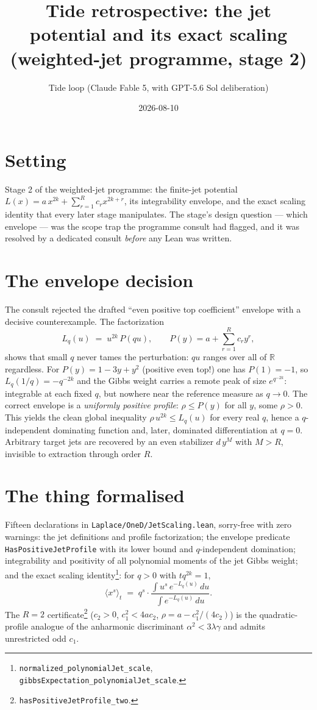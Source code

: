 \documentclass[11pt]{article}
\title{Tide retrospective: the jet potential and its exact scaling\\
(weighted-jet programme, stage 2)}
\author{Tide loop (Claude Fable 5, with GPT-5.6 Sol deliberation)}
\date{2026-08-10}
\begin{document}
\maketitle

\section{Setting}

Stage 2 of the weighted-jet programme: the finite-jet potential
$L(x) = a\,x^{2k} + \sum_{r=1}^R c_r x^{2k+r}$, its integrability
envelope, and the exact scaling identity that every later stage
manipulates. The stage's design question --- which envelope --- was
the scope trap the programme consult had flagged, and it was resolved
by a dedicated consult \emph{before} any Lean was written.

\section{The envelope decision}

The consult rejected the drafted ``even positive top coefficient''
envelope with a decisive counterexample. The factorization
\[
L_q(u) \;=\; u^{2k}\,P(qu),
\qquad P(y) = a + \sum_{r=1}^R c_r y^r,
\]
shows that small $q$ never tames the perturbation: $qu$ ranges over
all of $\mathbb{R}$ regardless. For $P(y) = 1 - 3y + y^2$ (positive
even top!) one has $P(1) = -1$, so $L_q(1/q) = -q^{-2k}$ and the
Gibbs weight carries a remote peak of size $e^{q^{-2k}}$: integrable
at each fixed $q$, but nowhere near the reference measure as
$q \to 0$. The correct envelope is a \emph{uniformly positive
profile}: $\rho \le P(y)$ for all $y$, some $\rho > 0$. This yields
the clean global inequality $\rho\,u^{2k} \le L_q(u)$ for every real
$q$, hence a $q$-independent dominating function and, later,
dominated differentiation at $q = 0$. Arbitrary target jets are
recovered by an even stabilizer $d\,y^M$ with $M > R$, invisible to
extraction through order $R$.

\section{The thing formalised}

Fifteen declarations in \texttt{Laplace/OneD/JetScaling.lean},
sorry-free with zero warnings: the jet definitions and profile
factorization; the envelope predicate
\texttt{HasPositiveJetProfile} with its lower bound and
$q$-independent domination; integrability and positivity of all
polynomial moments of the jet Gibbs weight; and the exact scaling
identity\footnote{\texttt{normalized\_polynomialJet\_scale},
\texttt{gibbsExpectation\_polynomialJet\_scale}.}: for $q > 0$ with
$t q^{2k} = 1$,
\[
\Big\langle x^s \Big\rangle_t
 \;=\; q^s \cdot
 \frac{\int u^s\, e^{-L_q(u)}\,du}{\int e^{-L_q(u)}\,du}.
\]
The $R = 2$ certificate\footnote{\texttt{hasPositiveJetProfile\_two}.}
($c_2 > 0$, $c_1^2 < 4ac_2$, $\rho = a - c_1^2/(4c_2)$) is the
quadratic-profile analogue of the anharmonic discriminant
$\alpha^2 < 3\lambda\gamma$ and admits unrestricted odd $c_1$.
\end{document}
